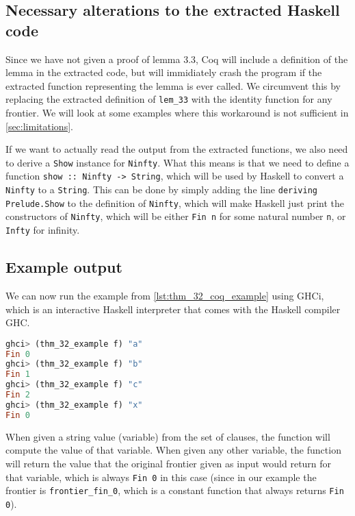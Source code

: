 \subsection{Necessary alterations to the extracted Haskell code}

Since we have not given a proof of lemma 3.3, Coq will include a definition of the lemma in the extracted code,
but will immidiately crash the program if the extracted function representing the lemma is ever called.
We circumvent this by replacing the extracted definition of \lstinline{lem_33} with the identity function
for any frontier. We will look at some examples where this workaround is not sufficient in
\autoref{sec:limitations}.

If we want to actually read the output from the extracted functions, we also need to
derive a \lstinline{Show} instance for \lstinline{Ninfty}.
What this means is that we need to define a function \lstinline{show :: Ninfty -> String},
which will be used by Haskell to convert a \lstinline{Ninfty} to a \lstinline{String}.
This can be done by simply adding the line \lstinline{deriving Prelude.Show} to the definition of \lstinline{Ninfty},
which will make Haskell just print the constructors of \lstinline{Ninfty},
which will be either \lstinline{Fin n} for some natural number \lstinline{n},
or \lstinline{Infty} for infinity.

\subsection{Example output}

We can now run the example from \autoref{lst:thm_32_coq_example} using GHCi,
which is an interactive Haskell interpreter that comes with the Haskell compiler GHC.

\begin{minipage}{\linewidth}
\begin{lstlisting}[language=Haskell, label={lst:thm_32_haskell_output}, caption={\lstinline{thm_32} example output}]
ghci> (thm_32_example f) "a"
Fin 0
ghci> (thm_32_example f) "b"
Fin 1
ghci> (thm_32_example f) "c"
Fin 2
ghci> (thm_32_example f) "x"
Fin 0
\end{lstlisting}
\end{minipage}

When given a string value (variable) from the set of clauses, the function will compute the value of that variable.
When given any other variable, the function will return the value that the original frontier given as input
would return for that variable, which is always \lstinline{Fin 0} in this case
(since in our example the frontier is \lstinline{frontier_fin_0},
which is a constant function that always returns \lstinline{Fin 0}).


